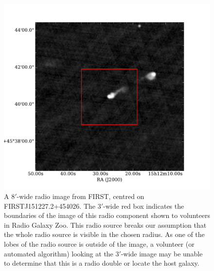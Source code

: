 \documentclass[fleqn,usenatbib,usedcolumn]{mnras}
\begin{document}
    \begin{figure}
      \centering
      \includegraphics[width=\linewidth]{images/ARG0000u0h_first_8.pdf}
      \caption{A $8'$-wide radio image from FIRST, centred on
        FIRSTJ151227.2+454026. The $3'$-wide red box indicates the boundaries of
        the image of this radio component shown to volunteers in Radio Galaxy
        Zoo. This radio source breaks our assumption that the whole radio source
        is visible in the chosen radius. As one of the lobes of the radio source
        is outside of the image, a volunteer (or automated algorithm) looking at
        the $3'$-wide image may be unable to determine that this is a radio
        double or locate the host galaxy.}
      \label{fig:broken-contains}
    \end{figure}
\end{document}
